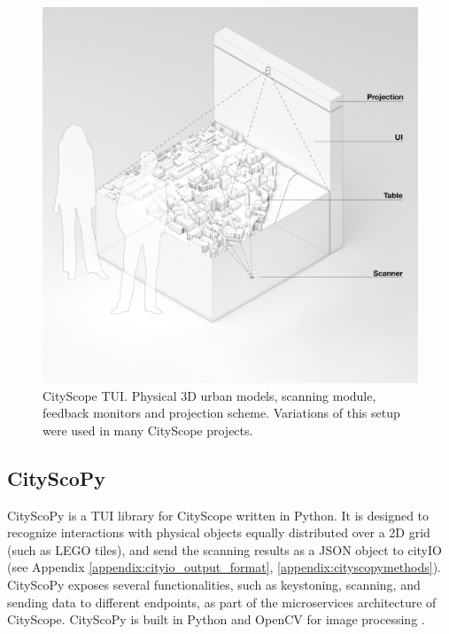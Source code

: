 {  \begin{figure}[!htb]
      \begin{center}
          \includegraphics[width=1\textwidth]{chapters/transformation/cs_arch/figures/cspy/cspy_0.jpeg}
      \end{center}
      \caption{CityScope TUI. Physical 3D urban models, scanning module, feedback monitors and projection scheme. Variations of this setup were used in many CityScope projects.}
      \label{fig:cspy_tui}
  \end{figure}

  \subsection{CityScoPy}\label{subsec:csarch-cityscopy}
  {
      CityScoPy is a TUI library for CityScope written in Python. It is designed to recognize interactions with physical objects equally distributed over a 2D grid (such as LEGO tiles), and send the scanning results as a JSON object to cityIO (see Appendix \eqref{appendix:cityio_output_format}, \eqref{appendix:cityscopymethods}). CityScoPy exposes several functionalities, such as keystoning, scanning, and sending data to different endpoints, as part of the microservices architecture of CityScope. CityScoPy is built in Python and OpenCV for image processing \cite{opencv_library}.


}}
